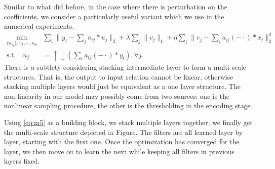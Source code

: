 \documentclass[a4paper]{article}
\begin{document}
Similar to what did before, in the case where there is perturbation on the coefficients, we consider a particularly useful variant which we use in the numerical experiments.
\begin{equation}
\label{eq:m5}
\begin{aligned}
	\min_{\{a_{ij}\}, v_1,\cdots,v_m}& \sum_i \|y_i - \sum_j a_{ij}*u_j\|_2 +\lambda \sum_j \|v_j\|_1 + \eta \sum_j \|v_j-  \sum_{i} a_{ij}(-\cdot)*x_i \|_2^2\\
	 \textrm{s.t.}  	\quad 	u_j&=\uparrow\downarrow(\sum_i a_{ij}(-\cdot)*y_i), \forall j.
	\end{aligned}
\end{equation}
There is a subtlety considering stacking intermediate layer to form a multi-scale structures. That is, the output to input relation cannot be linear, otherwise stacking multiple layers would just be equivalent as a one layer structure. The non-linearity in our model may possibly come from two sources: one is the nonlinear sampling procedure, the other is the thresholding in the encoding stage.

Using \eqref{eq:m5} as a building block, we stack multiple layers together, we finally get the multi-scale structure depicted in Figure. The filters are all learned layer by layer, starting with the first one. Once the optimization has converged for the layer, we then move on to learn the next while keeping all filters in previous layers fixed.
\end{document}
